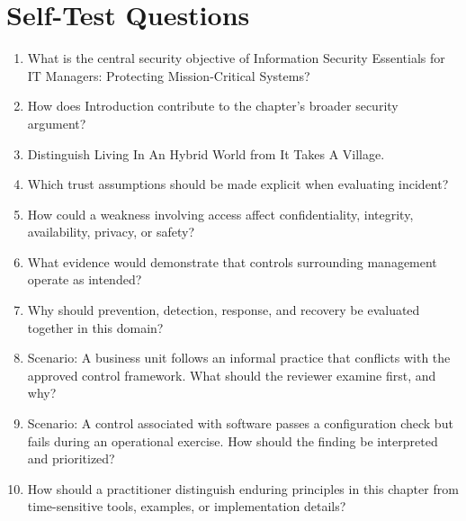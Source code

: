 \documentclass[11pt]{article}
\begin{document}
\section*{Self-Test Questions}
\begin{enumerate}
\item What is the central security objective of Information Security Essentials for IT Managers: Protecting Mission-Critical Systems?
\item How does Introduction contribute to the chapter's broader security argument?
\item Distinguish Living In An Hybrid World from It Takes A Village.
\item Which trust assumptions should be made explicit when evaluating incident?
\item How could a weakness involving access affect confidentiality, integrity, availability, privacy, or safety?
\item What evidence would demonstrate that controls surrounding management operate as intended?
\item Why should prevention, detection, response, and recovery be evaluated together in this domain?
\item Scenario: A business unit follows an informal practice that conflicts with the approved control framework. What should the reviewer examine first, and why?
\item Scenario: A control associated with software passes a configuration check but fails during an operational exercise. How should the finding be interpreted and prioritized?
\item How should a practitioner distinguish enduring principles in this chapter from time-sensitive tools, examples, or implementation details?
\end{enumerate}
\end{document}
